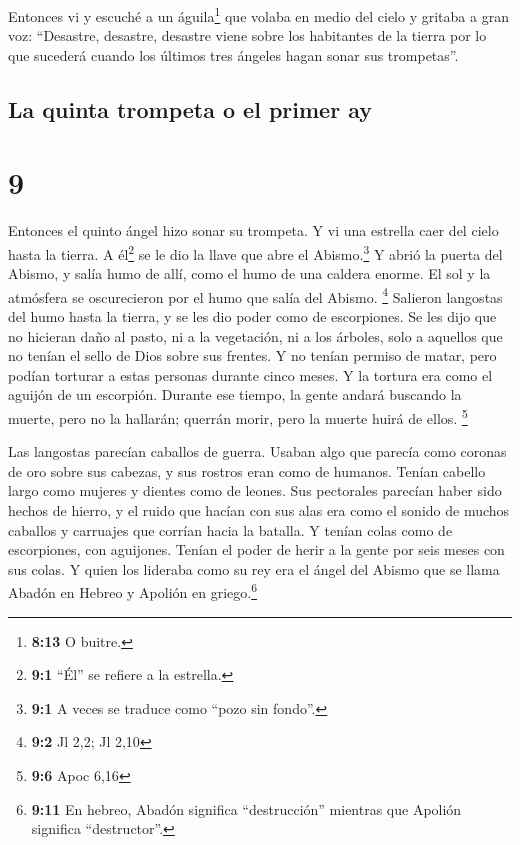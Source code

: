  Entonces vi y escuché a un águila\footnote{\textbf{8:13}
  O buitre.} que volaba en medio del cielo y gritaba a gran voz:
``Desastre, desastre, desastre viene sobre los habitantes de la tierra
por lo que sucederá cuando los últimos tres ángeles hagan sonar sus
trompetas''.

\hypertarget{la-quinta-trompeta-o-el-primer-ay}{%
\subsection{La quinta trompeta o el primer
ay}\label{la-quinta-trompeta-o-el-primer-ay}}

\hypertarget{section-8}{%
\section{9}\label{section-8}}

 Entonces el quinto ángel hizo sonar su trompeta. Y vi una
estrella caer del cielo hasta la tierra. A él\footnote{\textbf{9:1}
  ``Él'' se refiere a la estrella.} se le dio la llave que abre el
Abismo.\footnote{\textbf{9:1} A veces se traduce como ``pozo sin
  fondo''.}  Y abrió la puerta del Abismo, y salía humo de
allí, como el humo de una caldera enorme. El sol y la atmósfera se
oscurecieron por el humo que salía del Abismo. \footnote{\textbf{9:2} Jl
  2,2; Jl 2,10}  Salieron langostas del humo hasta la
tierra, y se les dio poder como de escorpiones.  Se les
dijo que no hicieran daño al pasto, ni a la vegetación, ni a los
árboles, solo a aquellos que no tenían el sello de Dios sobre sus
frentes.  Y no tenían permiso de matar, pero podían
torturar a estas personas durante cinco meses. Y la tortura era como el
aguijón de un escorpión.  Durante ese tiempo, la gente
andará buscando la muerte, pero no la hallarán; querrán morir, pero la
muerte huirá de ellos. \footnote{\textbf{9:6} Apoc 6,16}

 Las langostas parecían caballos de guerra. Usaban algo
que parecía como coronas de oro sobre sus cabezas, y sus rostros eran
como de humanos.  Tenían cabello largo como mujeres y
dientes como de leones.  Sus pectorales parecían haber
sido hechos de hierro, y el ruido que hacían con sus alas era como el
sonido de muchos caballos y carruajes que corrían hacia la batalla.
 Y tenían colas como de escorpiones, con aguijones.
Tenían el poder de herir a la gente por seis meses con sus colas.
 Y quien los lideraba como su rey era el ángel del Abismo
que se llama Abadón en Hebreo y Apolión en griego.\footnote{\textbf{9:11}
  En hebreo, Abadón significa ``destrucción'' mientras que Apolión
  significa ``destructor''.}

